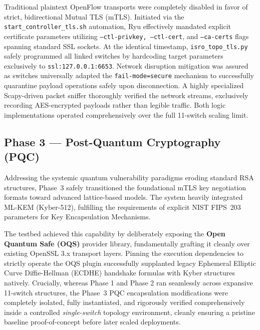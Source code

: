 \documentclass[12pt]{article}
\begin{document}
Traditional plaintext OpenFlow transports were completely disabled in favor of strict, bidirectional Mutual TLS (mTLS). Initiated via the \texttt{start\_controller\_tls.sh} automation, Ryu effectively mandated explicit certificate parameters utilizing \texttt{--ctl-privkey, --ctl-cert}, and \texttt{--ca-certs} flags spanning standard SSL sockets. At the identical timestamp, \texttt{isro\_topo\_tls.py} safely programmed all linked switches by hardcoding target parameters exclusively to \texttt{ssl:127.0.0.1:6653}. Network disruption mitigation was assured as switches universally adapted the \texttt{fail-mode=secure} mechanism to successfully quarantine payload operations safely upon disconnection. A highly specialized Scapy-driven packet sniffer thoroughly verified the network streams, exclusively recording AES-encrypted payloads rather than legible traffic. Both logic implementations operated comprehensively over the full 11-switch scaling limit.

\subsection{Phase 3 — Post-Quantum Cryptography (PQC)}

Addressing the systemic quantum vulnerability paradigms eroding standard RSA structures, Phase~3 safely transitioned the foundational mTLS key negotiation formats toward advanced lattice-based models. The system heavily integrated ML-KEM (Kyber-512), fulfilling the requirements of explicit NIST FIPS~203 parameters for Key Encapsulation Mechanisms.

The testbed achieved this capability by deliberately exposing the \textbf{Open Quantum Safe (OQS)} provider library, fundamentally grafting it cleanly over existing OpenSSL 3.x transport layers. Pinning the execution dependencies to strictly operate the OQS plugin successfully supplanted legacy Ephemeral Elliptic Curve Diffie-Hellman (ECDHE) handshake formulas with Kyber structures natively. Crucially, whereas Phase 1 and Phase 2 ran seamlessly across expansive 11-switch structures, the Phase~3 PQC encapsulation modifications were completely isolated, fully instantiated, and rigorously verified comprehensively inside a controlled \textit{single-switch} topology environment, cleanly ensuring a pristine baseline proof-of-concept before later scaled deployments.
\end{document}
